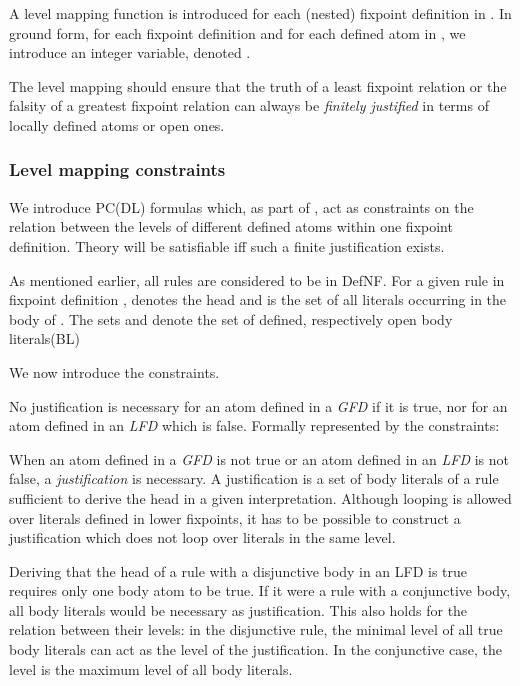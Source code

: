 \documentclass{tlp}
\begin{document}
A level mapping function  is introduced for each (nested) fixpoint definition  in . In ground form, for each fixpoint definition  and for each defined atom  in , we introduce an integer variable, denoted .

The level mapping should ensure that the truth of a least fixpoint relation or the falsity of a greatest fixpoint relation can always be \emph{finitely justified} in terms of locally defined atoms or open ones.

\subsubsection{Level mapping constraints}
We introduce PC(DL) formulas which, as part of , act as constraints on the relation between the levels of different defined atoms within one fixpoint definition. Theory  will be satisfiable iff such a finite justification exists.

As mentioned earlier, all rules are considered to be in DefNF. For a given rule  in fixpoint definition ,  denotes the head and  is the set of all literals occurring in the body of . The sets  and  denote the set of defined, respectively open body literals(BL)

We now introduce the constraints.

No justification is necessary for an atom defined in a {\em GFD} if it is true, nor for an atom defined in an {\em LFD} which is false. Formally represented by the constraints:


When an atom defined in a {\em GFD} is not true or an atom defined in an {\em LFD} is not false, a \emph{justification} is necessary. A justification is a set of body literals of a rule sufficient to derive the head in a given interpretation. Although looping is allowed over literals defined in lower fixpoints, it has to be possible to construct a justification which does not loop over literals in the same level.

Deriving that the head of a rule with a disjunctive body in an LFD is true requires only one body atom to be true. If it were a rule with a conjunctive body, all body literals would be necessary as justification. This also holds for the relation between their levels: in the disjunctive rule, the minimal level of all true body literals can act as the level of the justification. In the conjunctive case, the level is the maximum level of all body literals.
\end{document}
